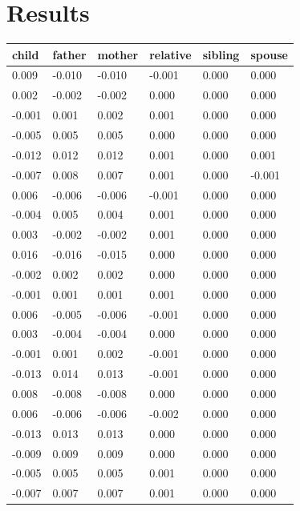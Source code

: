 \chapter{Results}


\begin{longtable}{llllll}
\textbf{child} & \textbf{father} & \textbf{mother} & \textbf{relative} & \textbf{sibling} & \textbf{spouse} \\ \hline
0.009  & -0.010 & -0.010 & -0.001   & 0.000   & 0.000  \\
0.002  & -0.002 & -0.002 & 0.000    & 0.000   & 0.000  \\
-0.001 & 0.001  & 0.002  & 0.001    & 0.000   & 0.000  \\
-0.005 & 0.005  & 0.005  & 0.000    & 0.000   & 0.000  \\
-0.012 & 0.012  & 0.012  & 0.001    & 0.000   & 0.001  \\
-0.007 & 0.008  & 0.007  & 0.001    & 0.000   & -0.001 \\
0.006  & -0.006 & -0.006 & -0.001   & 0.000   & 0.000  \\
-0.004 & 0.005  & 0.004  & 0.001    & 0.000   & 0.000  \\
0.003  & -0.002 & -0.002 & 0.001    & 0.000   & 0.000  \\
0.016  & -0.016 & -0.015 & 0.000    & 0.000   & 0.000  \\
-0.002 & 0.002  & 0.002  & 0.000    & 0.000   & 0.000  \\
-0.001 & 0.001  & 0.001  & 0.001    & 0.000   & 0.000  \\
0.006  & -0.005 & -0.006 & -0.001   & 0.000   & 0.000  \\
0.003  & -0.004 & -0.004 & 0.000    & 0.000   & 0.000  \\
-0.001 & 0.001  & 0.002  & -0.001   & 0.000   & 0.000  \\
-0.013 & 0.014  & 0.013  & -0.001   & 0.000   & 0.000  \\
0.008  & -0.008 & -0.008 & 0.000    & 0.000   & 0.000  \\
0.006  & -0.006 & -0.006 & -0.002   & 0.000   & 0.000  \\
-0.013 & 0.013  & 0.013  & 0.000    & 0.000   & 0.000  \\
-0.009 & 0.009  & 0.009  & 0.000    & 0.000   & 0.000  \\
-0.005 & 0.005  & 0.005  & 0.001    & 0.000   & 0.000  \\
-0.007 & 0.007  & 0.007  & 0.001    & 0.000   & 0.000  \\

\end{longtable}
